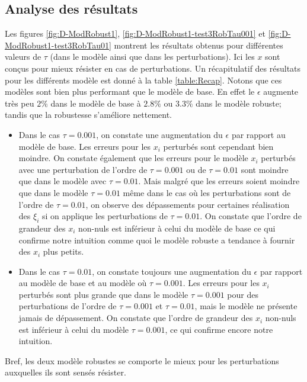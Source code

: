 \subsection{Analyse des résultats}
Les figures \ref{fig:D-ModRobust1}, \ref{fig:D-ModRobust1-test3RobTau001} et \ref{fig:D-ModRobust1-test3RobTau01} montrent les résultats obtenus pour différentes valeurs de $\tau$ (dans le modèle ainsi que dans les perturbations). Ici les $x$ sont conçus pour mieux résister en cas de perturbations. Un récapitulatif des résultats pour les différents modèle est donné à la table \ref{table:Recap}. Notons que ces modèles sont bien plus performant que le modèle de base. En effet le $\epsilon$ augmente très peu $2\%$ dans le modèle de base à $2.8\%$ ou $3.3\%$ dans le modèle robuste; tandis que la robustesse s'améliore nettement.\\
\begin{itemize}
\item Dans le cas $\tau = 0.001$, on constate une augmentation du $\epsilon$ par rapport au modèle de base. Les erreurs pour les $x_i$ perturbés sont cependant bien moindre. On constate également que les erreurs pour le modèle $x_i$ perturbés avec une perturbation de l'ordre de $\tau=0.001$ ou de $\tau = 0.01$ sont moindre que dans le modèle avec $\tau=0.01$. Mais malgré que les erreurs soient moindre que dans le modèle $\tau = 0.01$ même dans le cas où les perturbations sont de l'ordre de $\tau =0.01$, on  observe des dépassements pour certaines réalisation des $\xi_i$ si on applique les perturbations de $\tau=0.01$. On constate que l'ordre de grandeur des $x_i$ non-nuls est inférieur à celui du modèle de base ce qui confirme notre intuition comme quoi le modèle robuste a tendance à fournir des $x_i$ plus petits.\\ 
 \item Dans le cas $\tau = 0.01$, on constate toujours une augmentation du $\epsilon$ par rapport au modèle de base et au modèle où $\tau = 0.001$. Les erreurs pour les $x_i$ perturbés sont plus grande que dans le modèle $\tau=0.001$ pour des perturbations de l'ordre de $\tau = 0.001$ et $\tau=0.01$, mais le modèle ne présente jamais de dépassement. On constate que l'ordre de grandeur des $x_i$ non-nuls est inférieur à celui du modèle $\tau=0.001$, ce qui confirme encore notre intuition.
\end{itemize}
Bref, les deux modèle robustes se comporte le mieux pour les perturbations auxquelles ils sont sensés résister.

